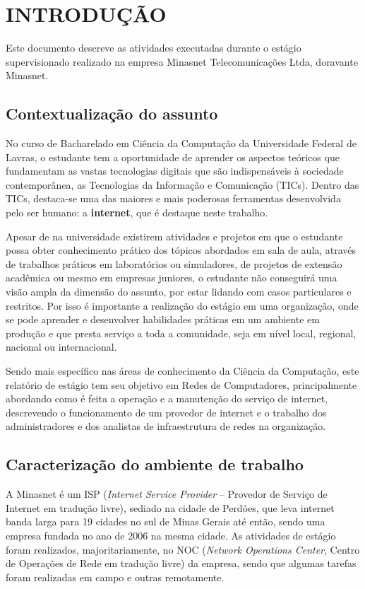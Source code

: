 \chapter{INTRODUÇÃO}

    Este documento descreve as atividades executadas durante o estágio supervisionado realizado na empresa Minasnet Telecomunicações Ltda, doravante Minasnet.

\section{Contextualização do assunto}

    No curso de Bacharelado em Ciência da Computação da Universidade Federal de Lavras, o estudante tem a oportunidade de aprender os aspectos teóricos que fundamentam as vastas tecnologias digitais que são indispensáveis à sociedade contemporânea, as Tecnologias da Informação e Comunicação (TICs). Dentro das TICs, destaca-se uma das maiores e mais poderosas ferramentas desenvolvida pelo ser humano: a \textbf{internet}, que é destaque neste trabalho.

    Apesar de na universidade existirem atividades e projetos em que o estudante possa obter conhecimento prático dos tópicos abordados em sala de aula, através de trabalhos práticos em laboratórios ou simuladores, de projetos de extensão acadêmica ou mesmo em empresas juniores, o estudante não conseguirá uma visão ampla da dimensão do assunto, por estar lidando com casos particulares e restritos. Por isso é importante a realização do estágio em uma organização, onde se pode aprender e desenvolver habilidades práticas em um ambiente em produção e que presta serviço a toda a comunidade, seja em nível local, regional, nacional ou internacional.
    
    Sendo mais específico nas áreas de conhecimento da Ciência da Computação, este relatório de estágio tem seu objetivo em Redes de Computadores, principalmente abordando como é feita a operação e a manutenção do serviço de internet, descrevendo o funcionamento de um provedor de internet e o trabalho dos administradores e dos analistas de infraestrutura de redes na organização.

\section{Caracterização do ambiente de trabalho}

    A Minasnet é um ISP (\textit{Internet Service Provider} -- Provedor de Serviço de Internet em tradução livre), sediado na cidade de Perdões, que leva internet banda larga para 19 cidades no sul de Minas Gerais até então, sendo uma empresa fundada no ano de 2006 na mesma cidade. As atividades de estágio foram realizados, majoritariamente, no NOC (\textit{Network Operations Center}, Centro de Operações de Rede em tradução livre) da empresa, sendo que algumas tarefas foram realizadas em campo e outras remotamente.

